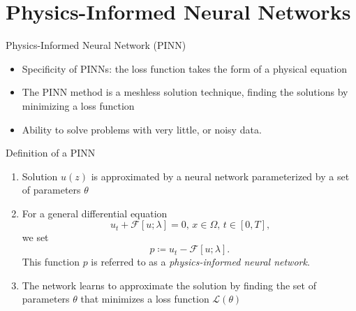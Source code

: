 \section{Physics-Informed Neural Networks}\label{sec:pinns}


\begin{frame}{Physics-Informed Neural Network (PINN)}
\begin{itemize}
    \item Specificity of PINNs: the loss function takes the form of a physical equation
    \item The PINN method is a meshless solution technique, finding the solutions by minimizing a loss function
    \item Ability to solve problems with very little, or noisy data.
    
\end{itemize}
    
\end{frame}



\begin{frame}{Definition of a PINN}
    \begin{enumerate}
        \item Solution $u(z)$ is approximated by a neural network parameterized by a set of parameters $\theta$
        \item For a general differential equation 
        \begin{equation*}
            \label{eq:pde-exemple}
            u_t + \mathcal{F}[u;\lambda] = 0\text{, } x\in \Omega\text{, } t \in [0, T]\text{,}
        \end{equation*} we set
        \begin{equation*}
            p \coloneqq u_t - \mathcal{F}[u;\lambda] \text{.}
        \end{equation*} This function $p$ is referred to as a \emph{physics-informed neural network}.
        \item The network learns to approximate the solution by finding the set of parameters $\theta$ that minimizes a loss function $\mathcal{L}(\theta)$
    \end{enumerate}
\end{frame}


